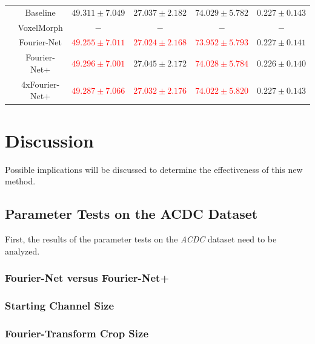 \documentclass[english,version-2022-01]{uzl-thesis} %
\begin{document}
\begin{table}[h]
\begin{tabular}{c c c c c c}
		\midrule		
		\multirow{5}{*}{\rotatebox{90}{$R=10$}} & Baseline & $49.311 \pm 7.049$ & $27.037 \pm 2.182$ & $74.029 \pm 5.782$ & $0.227 \pm 0.143$ \\  
		 & VoxelMorph & $-$ & $-$ & $-$ & $-$ \\  
		 & Fourier-Net & \textcolor{red}{$49.255 \pm 7.011$} & \textcolor{red}{$27.024 \pm 2.168$} & \textcolor{red}{$73.952 \pm 5.793$} & $0.227 \pm 0.141$ \\  
		 & Fourier-Net+ & \textcolor{red}{$49.296 \pm 7.001$} & $27.045 \pm 2.172$ & \textcolor{red}{$74.028 \pm 5.784$} & $0.226 \pm 0.140$ \\   
		 & 4xFourier-Net+ & \textcolor{red}{$49.287 \pm 7.066$} & \textcolor{red}{$27.032 \pm 2.176$} & \textcolor{red}{$74.022 \pm 5.820$} & $0.227 \pm 0.143$ \\ 
		 \bottomrule
	\end{tabular}
\end{table}



\chapter{Discussion} \label{Ch:Discussion}
Possible implications will be discussed to determine the effectiveness of this new method.

\section{Parameter Tests on the ACDC Dataset} \label{Sec:DiscussionParameterTestsACDC}
First, the results of the parameter tests on the \emph{ACDC} dataset need to be analyzed.

\subsection{Fourier-Net versus Fourier-Net+} \label{SubSec:DiscussionFourier-NetvsFourier-Net+ACDC}

\subsection{Starting Channel Size} \label{SubSec:DiscussionStartingChannelsACDC}

\subsection{Fourier-Transform Crop Size} \label{SubSec:DiscussionFTCropSize}
\end{document}

